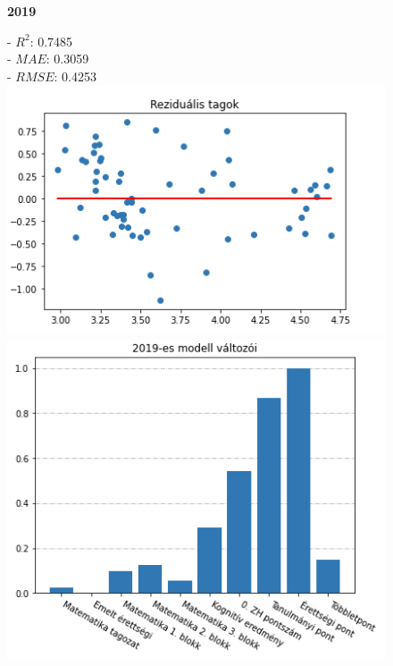 \documentclass[12pt]{article}
\begin{document}
\begin{figure}[H]
    \centering
    \begin{minipage}[b]{0.4\textwidth}
    \begin{center}
    \textbf{2019}
    \end{center}
    \raggedright
    - $R^2$: 0.7485 \\
    - $MAE$: 0.3059 \\
    - $RMSE$: 0.4253 \\
    	\centering
        \includegraphics[width=1\textwidth, left]{kepek/residual2019_2.png} %
        \includegraphics[width=1\textwidth, left]{kepek/kumulalt2019_2.png} %
    \end{minipage}

\end{figure}
\end{document}
